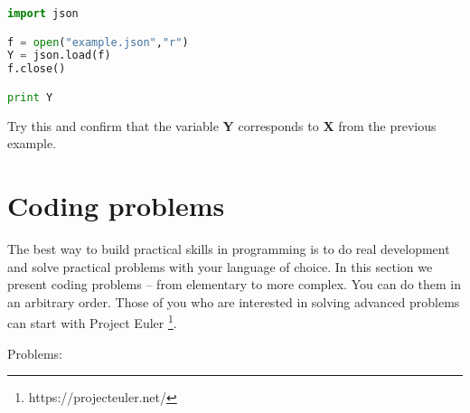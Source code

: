 \begin{lstlisting}[language=Python,style=codelst2,caption={Python: load from JSON file}]
import json

f = open("example.json","r")
Y = json.load(f)
f.close()

print Y
\end{lstlisting}
Try this and confirm that the variable \textbf{Y} corresponds to
\textbf{X} from the previous example.


\section{Coding problems}

The best way to build practical skills in programming is to do
real development and solve practical problems with your language
of choice. In this section we present coding problems -- from elementary
to more complex. You can do them in an arbitrary order. Those of
you who are interested in solving advanced problems can start 
with Project Euler \footnote{https://projecteuler.net/}.

Problems:

